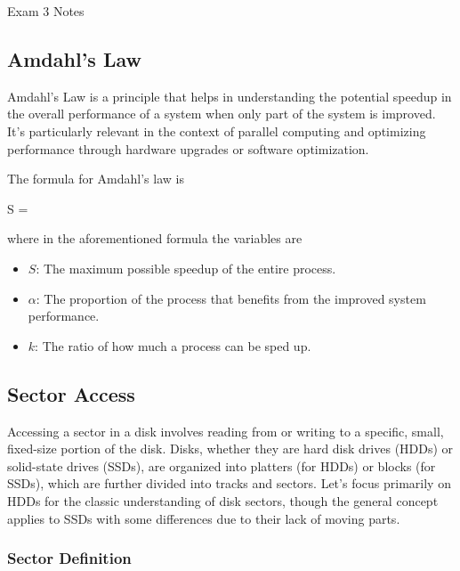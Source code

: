 \begin{examnotes}{Exam 3 Notes}
    \subsection*{Amdahl's Law}

    Amdahl's Law is a principle that helps in understanding the potential speedup in the overall performance of a system when only part of the system is improved. It's particularly relevant in the 
    context of parallel computing and optimizing performance through hardware upgrades or software optimization.

    The formula for Amdahl's law is

    \begin{center}
        \begin{highlightbox}
            S = 
        \end{highlightbox}
    \end{center}
    where in the aforementioned formula the variables are

    \begin{itemize}
        \item $S$: The maximum possible speedup of the entire process.
        \item $\alpha$: The proportion of the process that benefits from the improved system performance.
        \item $k$: The ratio of how much a process can be sped up.
    \end{itemize}

    \subsection*{Sector Access}

    Accessing a sector in a disk involves reading from or writing to a specific, small, fixed-size portion of the disk. Disks, whether they are hard disk drives (HDDs) or solid-state drives (SSDs), 
    are organized into platters (for HDDs) or blocks (for SSDs), which are further divided into tracks and sectors. Let's focus primarily on HDDs for the classic understanding of disk sectors, 
    though the general concept applies to SSDs with some differences due to their lack of moving parts.

    \subsubsection*{Sector Definition}


\end{examnotes}
